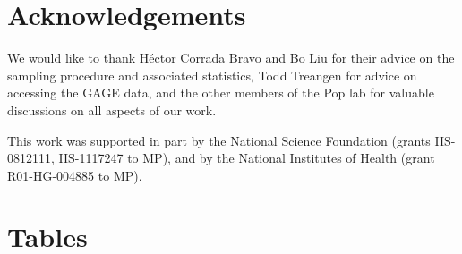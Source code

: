 \section{Acknowledgements}
We would like to thank H\'{e}ctor Corrada Bravo and Bo Liu for their advice on the sampling procedure and associated statistics, Todd Treangen for advice on accessing the GAGE data, and the other members of the Pop lab for valuable discussions on all aspects of our work.

This work was supported in part by the National Science Foundation
(grants IIS-0812111, IIS-1117247 to MP), and by the National
Institutes of Health (grant R01-HG-004885 to MP).











\section{Tables}

